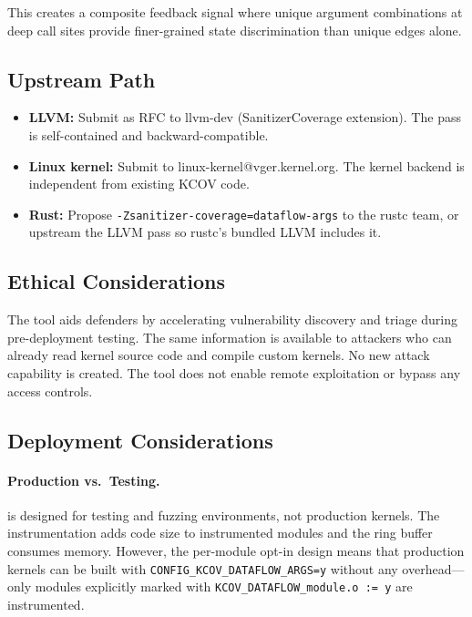 \documentclass{ndss}
\begin{document}
This creates a composite feedback signal where unique argument combinations at
deep call sites provide finer-grained state discrimination than unique edges
alone.

\subsection{Upstream Path}

\begin{itemize}[nosep]
  \item \textbf{LLVM:} Submit as RFC to llvm-dev (SanitizerCoverage extension).
        The pass is self-contained and backward-compatible.
  \item \textbf{Linux kernel:} Submit to linux-kernel@vger.kernel.org. The
        kernel backend is independent from existing KCOV code.
  \item \textbf{Rust:} Propose \texttt{-Zsanitizer-coverage=dataflow-args} to
        the rustc team, or upstream the LLVM pass so rustc's bundled LLVM
        includes it.
\end{itemize}

\subsection{Ethical Considerations}

The tool aids defenders by accelerating vulnerability discovery and triage
during pre-deployment testing. The same information is available to attackers
who can already read kernel source code and compile custom kernels. No new
attack capability is created. The tool does not enable remote exploitation or
bypass any access controls.

\subsection{Deployment Considerations}

\paragraph{Production vs.\ Testing.} \toolname{} is designed for testing and
fuzzing environments, not production kernels. The instrumentation adds code
size to instrumented modules and the ring buffer consumes memory. However, the
per-module opt-in design means that production kernels can be built with
\texttt{CONFIG\_KCOV\_DATAFLOW\_ARGS=y} without any overhead---only modules
explicitly marked with \texttt{KCOV\_DATAFLOW\_module.o := y} are instrumented.
\end{document}
